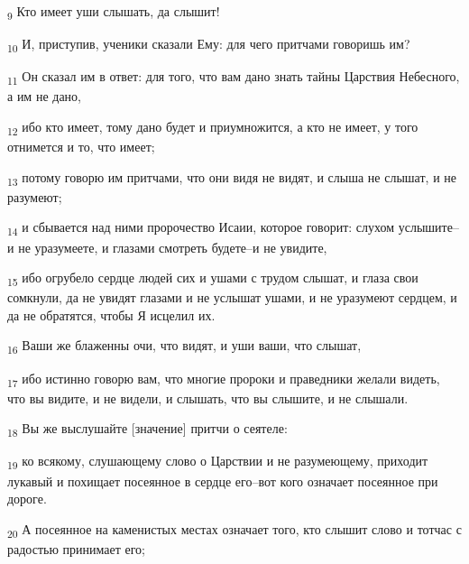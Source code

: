 \begin{tcolorbox}
\textsubscript{9} Кто имеет уши слышать, да слышит!
\end{tcolorbox}
\begin{tcolorbox}
\textsubscript{10} И, приступив, ученики сказали Ему: для чего притчами говоришь им?
\end{tcolorbox}
\begin{tcolorbox}
\textsubscript{11} Он сказал им в ответ: для того, что вам дано знать тайны Царствия Небесного, а им не дано,
\end{tcolorbox}
\begin{tcolorbox}
\textsubscript{12} ибо кто имеет, тому дано будет и приумножится, а кто не имеет, у того отнимется и то, что имеет;
\end{tcolorbox}
\begin{tcolorbox}
\textsubscript{13} потому говорю им притчами, что они видя не видят, и слыша не слышат, и не разумеют;
\end{tcolorbox}
\begin{tcolorbox}
\textsubscript{14} и сбывается над ними пророчество Исаии, которое говорит: слухом услышите--и не уразумеете, и глазами смотреть будете--и не увидите,
\end{tcolorbox}
\begin{tcolorbox}
\textsubscript{15} ибо огрубело сердце людей сих и ушами с трудом слышат, и глаза свои сомкнули, да не увидят глазами и не услышат ушами, и не уразумеют сердцем, и да не обратятся, чтобы Я исцелил их.
\end{tcolorbox}
\begin{tcolorbox}
\textsubscript{16} Ваши же блаженны очи, что видят, и уши ваши, что слышат,
\end{tcolorbox}
\begin{tcolorbox}
\textsubscript{17} ибо истинно говорю вам, что многие пророки и праведники желали видеть, что вы видите, и не видели, и слышать, что вы слышите, и не слышали.
\end{tcolorbox}
\begin{tcolorbox}
\textsubscript{18} Вы же выслушайте [значение] притчи о сеятеле:
\end{tcolorbox}
\begin{tcolorbox}
\textsubscript{19} ко всякому, слушающему слово о Царствии и не разумеющему, приходит лукавый и похищает посеянное в сердце его--вот кого означает посеянное при дороге.
\end{tcolorbox}
\begin{tcolorbox}
\textsubscript{20} А посеянное на каменистых местах означает того, кто слышит слово и тотчас с радостью принимает его;
\end{tcolorbox}
